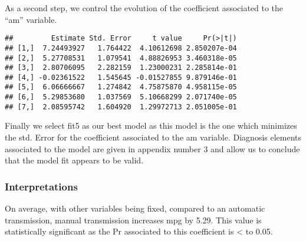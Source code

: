 \documentclass[
]{article}
\newenvironment{Shaded}{\begin{snugshade}}{\end{snugshade}}
\newcommand{\DecValTok}[1]{\textcolor[rgb]{0.00,0.00,0.81}{#1}}
\newcommand{\KeywordTok}[1]{\textcolor[rgb]{0.13,0.29,0.53}{\textbf{#1}}}
\newcommand{\NormalTok}[1]{#1}
\newcommand{\OperatorTok}[1]{\textcolor[rgb]{0.81,0.36,0.00}{\textbf{#1}}}
\begin{document}
As a second step, we control the evolution of the coefficient associated
to the ``am'' variable.

\begin{Shaded}
\end{Shaded}

\begin{verbatim}
##         Estimate Std. Error     t value     Pr(>|t|)
## [1,]  7.24493927   1.764422  4.10612698 2.850207e-04
## [2,]  5.27708531   1.079541  4.88826953 3.460318e-05
## [3,]  2.80706095   2.282159  1.23000231 2.285814e-01
## [4,] -0.02361522   1.545645 -0.01527855 9.879146e-01
## [5,]  6.06666667   1.274842  4.75875870 4.958115e-05
## [6,]  5.29853680   1.037569  5.10668299 2.071740e-05
## [7,]  2.08595742   1.604920  1.29972713 2.051005e-01
\end{verbatim}

Finally we select fit5 as our best model as this model is the one which
minimizes the std. Error for the coefficient associated to the am
variable. Diagnosis elements associated to the model are given in
appendix number 3 and allow us to conclude that the model fit appears to
be valid.\\

\hypertarget{interpretations}{%
\subsubsection{Interpretations}\label{interpretations}}

On average, with other variables being fixed, compared to an automatic
transmission, manual transmission increases mpg by 5.29. This value is
statistically significant as the Pr associated to this coefficient is
\textless{} to 0.05.
\end{document}
